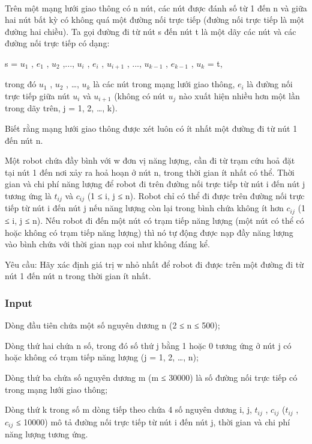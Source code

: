 

 

Trên một mạng lưới giao thông có n nút, các nút được đánh số từ 1 đến n và giữa hai nút bất kỳ có không quá một đường nối trực tiếp (đường nối trực tiếp là một đường hai chiều). Ta gọi đường đi từ nút s đến nút t là một dãy các nút và các đường nối trực tiếp có dạng:

s = $u_{1}$ , $e_{1}$ , $u_{2}$ ,..., $u_{i}$ , $e_{i}$ , $u_{i+1}$ , ..., $u_{k-1}$ , $e_{k-1}$ , $u_{k}$ = t,

trong đó $u_{1}$ , $u_{2}$ , …, $u_{k}$ là các nút trong mạng lưới giao thông, $e_{i}$ là đường nối trực tiếp giữa nút $u_{i}$ và $u_{i+1}$ (không có nút $u_{j}$ nào xuất hiện nhiều hơn một lần trong dãy trên, j = 1, 2, …, k).

Biết rằng mạng lưới giao thông được xét luôn có ít nhất một đường đi từ nút 1 đến nút n.

Một robot chứa đầy bình với w đơn vị năng lượng, cần đi từ trạm cứu hoả đặt tại nút 1 đến nơi xảy ra hoả hoạn ở nút n, trong thời gian ít nhất có thể. Thời gian và chi phí năng lượng để robot đi trên đường nối trực tiếp từ nút i đến nút j tương ứng là $t_{ij}$ và $c_{ij}$ (1 ≤ i, j ≤ n). Robot chỉ có thể đi được trên đường nối trực tiếp từ nút i đến nút j nếu năng lượng còn lại trong bình chứa không ít hơn $c_{ij}$ (1 ≤ i, j ≤ n). Nếu robot đi đến một nút có trạm tiếp năng lượng (một nút có thể có hoặc không có trạm tiếp năng lượng) thì nó tự động được nạp đầy năng lượng vào bình chứa với thời gian nạp coi như không đáng kể.

Yêu cầu: Hãy xác định giá trị w nhỏ nhất để robot đi được trên một đường đi từ nút 1 đến nút n trong thời gian ít nhất.

\subsubsection{Input}

Dòng đầu tiên chứa một số nguyên dương n (2 ≤ n ≤ 500);

Dòng thứ hai chứa n số, trong đó số thứ j bằng 1 hoặc 0 tương ứng ở nút j có hoặc không có trạm tiếp năng lượng (j = 1, 2, …, n);

Dòng thứ ba chứa số nguyên dương m (m ≤ 30000) là số đường nối trực tiếp có trong mạng lưới giao thông;

Dòng thứ k trong số m dòng tiếp theo chứa 4 số nguyên dương i, j, $t_{ij}$ , $c_{ij}$ ($t_{ij}$ , $c_{ij}$ ≤ 10000) mô tả đường nối trực tiếp từ nút i đến nút j, thời gian và chi phí năng lượng tương ứng.

